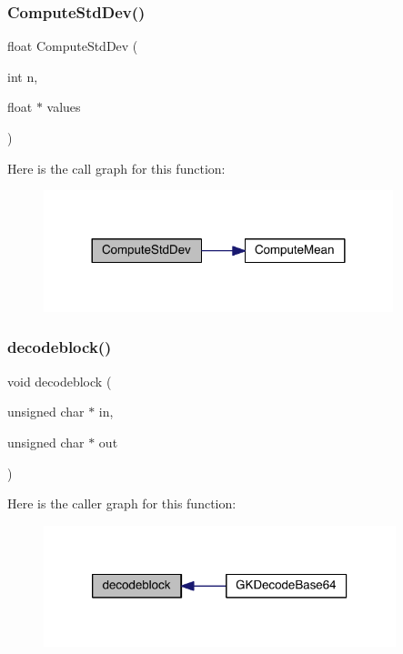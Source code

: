 \subsubsection{\texorpdfstring{Compute\+Std\+Dev()}{ComputeStdDev()}}
{\footnotesize\ttfamily float Compute\+Std\+Dev (\begin{DoxyParamCaption}\item[{int}]{n,  }\item[{float $\ast$}]{values }\end{DoxyParamCaption})}

Here is the call graph for this function\+:\nopagebreak
\begin{figure}[H]
\begin{center}
\leavevmode
\includegraphics[width=288pt]{a00077_a59fad97dedb62ff1ae0722de46318412_cgraph}
\end{center}
\end{figure}
\mbox{\label{a00077_a16b79810a7cfac6a5bc729e7bea80f7b}} 
\subsubsection{\texorpdfstring{decodeblock()}{decodeblock()}}
{\footnotesize\ttfamily void decodeblock (\begin{DoxyParamCaption}\item[{unsigned char $\ast$}]{in,  }\item[{unsigned char $\ast$}]{out }\end{DoxyParamCaption})}

Here is the caller graph for this function\+:\nopagebreak
\begin{figure}[H]
\begin{center}
\leavevmode
\includegraphics[width=290pt]{a00077_a16b79810a7cfac6a5bc729e7bea80f7b_icgraph}
\end{center}
\end{figure}
\mbox{\label{a00077_a9196de4bd8fefa1d09e0d4a273dedde5}} 
